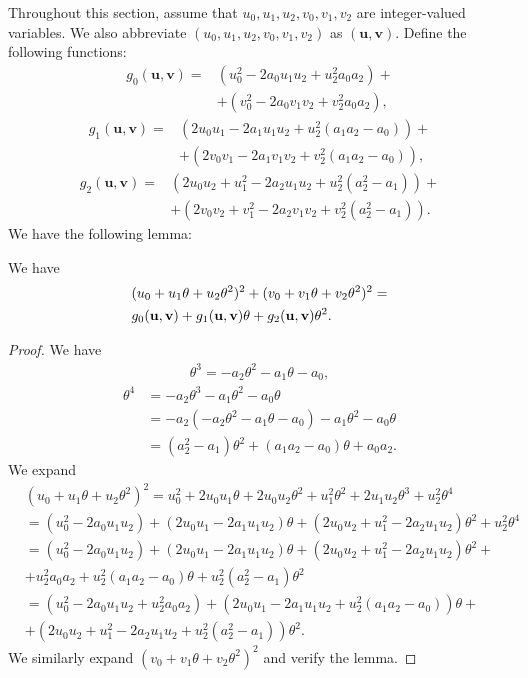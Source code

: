 \documentclass[12pt]{amsart}
\newcommand{\1}{\mathmybb{1}}
\begin{document}
Throughout this section, assume that $u_{0},u_{1},u_{2},v_{0},v_{1},v_{2}$ are integer-valued variables. We also abbreviate $(u_{0},u_{1},u_{2},v_{0},v_{1},v_{2})$ as $(\mathbf{u},\mathbf{v})$. Define the following functions:
\begin{align*}
g_{0}(\mathbf{u},\mathbf{v}) = &(u_{0}^2-2a_{0}u_{1}u_{2}+u_{2}^2a_{0}a_{2})+\\
&+(v_{0}^2-2a_{0}v_{1}v_{2}+v_{2}^2a_{0}a_{2}),
\end{align*}
\begin{align*}
g_{1}(\mathbf{u},\mathbf{v}) = &\left(2u_{0}u_{1}-2a_{1}u_{1}u_{2}+u_{2}^2(a_{1}a_{2}-a_{0})\right) +\\
&+\left(2v_{0}v_{1}-2a_{1}v_{1}v_{2}+v_{2}^2(a_{1}a_{2}-a_{0})\right),
\end{align*}
\begin{align*}
g_{2}(\mathbf{u},\mathbf{v}) = &(2u_{0}u_{2}+u_{1}^2 -2a_{2}u_{1}u_{2}+u_{2}^2(a_{2}^2-a_{1}))+\\
&+(2v_{0}v_{2}+v_{1}^2 -2a_{2}v_{1}v_{2}+v_{2}^2(a_{2}^2-a_{1})).
\end{align*}
We have the following lemma:
\begin{lem}
\label{Expansionubfvbfsum2squares}
We have
\begin{align*}
&(u_{0}+u_{1}\theta+u_{2}\theta^2)^2+(v_{0}+v_{1}\theta+v_{2}\theta^2)^2 = \notag \\
&g_{0}(\mathbf{u},\mathbf{v}) + g_{1}(\mathbf{u},\mathbf{v})\theta+g_{2}(\mathbf{u},\mathbf{v})\theta^2.
\end{align*}
\end{lem}
\begin{proof}
We have
\begin{align*}
\theta^3 = -a_{2}\theta^2-a_{1}\theta-a_{0},
\end{align*}
\begin{align*}
\theta^{4} &= -a_{2}\theta^3-a_{1}\theta^2-a_{0}\theta\\
&= -a_{2}(-a_{2}\theta^2-a_{1}\theta-a_{0})-a_{1}\theta^2-a_{0}\theta\\
&=(a_{2}^2-a_{1})\theta^2+(a_{1}a_{2}-a_{0})\theta+a_{0}a_{2}.
\end{align*}
We expand
\begin{align*}
&(u_{0}+u_{1}\theta+u_{2}\theta^2)^2 = u_{0}^2 +2u_{0}u_{1}\theta + 2u_{0}u_{2}\theta^2 +u_{1}^2 \theta^2 + 2u_{1}u_{2}\theta^3+u_{2}^2\theta^4\\
&= (u_{0}^2-2a_{0}u_{1}u_{2})+(2u_{0}u_{1}-2a_{1}u_{1}u_{2})\theta +(2u_{0}u_{2}+u_{1}^2 -2a_{2}u_{1}u_{2})\theta^2+u_{2}^2\theta^4\\
&=(u_{0}^2-2a_{0}u_{1}u_{2})+(2u_{0}u_{1}-2a_{1}u_{1}u_{2})\theta +(2u_{0}u_{2}+u_{1}^2 -2a_{2}u_{1}u_{2})\theta^2+\\
&+u_{2}^2a_{0}a_{2}+u_{2}^2(a_{1}a_{2}-a_{0})\theta +u_{2}^2(a_{2}^2-a_{1})\theta^2\\
&= (u_{0}^2-2a_{0}u_{1}u_{2}+u_{2}^2a_{0}a_{2}) + (2u_{0}u_{1}-2a_{1}u_{1}u_{2}+u_{2}^2(a_{1}a_{2}-a_{0}))\theta+\\
&+(2u_{0}u_{2}+u_{1}^2 -2a_{2}u_{1}u_{2}+u_{2}^2(a_{2}^2-a_{1}))\theta^2.
\end{align*}
We similarly expand $(v_{0}+v_{1}\theta+v_{2}\theta^2)^2$ and verify the lemma.
\end{proof}
\end{document}
